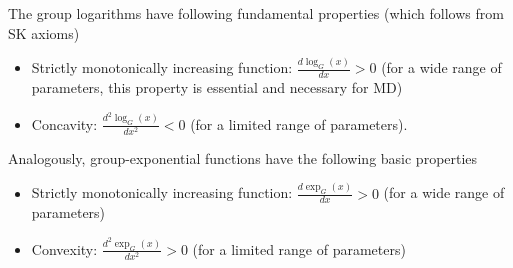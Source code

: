 \documentclass[10pt]{amsart}
\theoremstyle{definition}
\theoremstyle{definition}	 %
\begin{document}


The group logarithms have following fundamental properties (which follows from SK axioms)

  \begin{itemize}


 \item

Strictly monotonically increasing function: $\displaystyle \frac{d \log_G(x)}{dx} >0$ \;\; (for a wide range of parameters, this property is essential and necessary for MD) \\

 \item

 Concavity:  $\displaystyle \frac{d^2 \log_{G}(x)}{dx^2} < 0$ \;\; (for a limited range of parameters).

 \end{itemize}

 Analogously, group-exponential functions have the following basic properties

 \begin{itemize}







 \item

Strictly monotonically increasing function: $\displaystyle \frac{d \exp_G(x)}{dx} >0$ \;\; (for a wide range of parameters) \\

 \item

Convexity:  $\displaystyle \frac{d^2 \exp_{G}(x)}{dx^2} > 0$ \;\; (for a limited range of parameters)\\



 \end{itemize}
\end{document}
